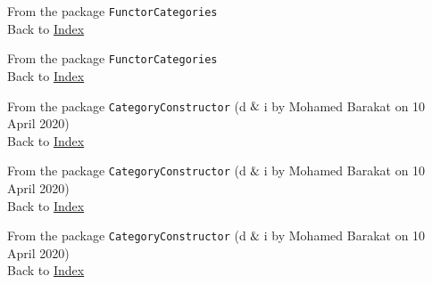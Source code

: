 
From the package \texttt{FunctorCategories}\\
Back to \hyperref[lol]{Index}
		

From the package \texttt{FunctorCategories}\\
Back to \hyperref[lol]{Index}
		

From the package \texttt{CategoryConstructor} (d$\And$i by Mohamed Barakat on 10 April 2020) \\
Back to \hyperref[lol]{Index}
		

From the package \texttt{CategoryConstructor} (d$\And$i by Mohamed Barakat on 10 April 2020)\\
Back to \hyperref[lol]{Index}
		

From the package \texttt{CategoryConstructor} (d$\And$i by Mohamed Barakat on 10 April 2020)\\
Back to \hyperref[lol]{Index}

		
